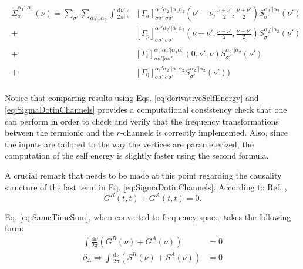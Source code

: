 \documentclass[12pt,a4paper,roman]{article}
\newcommand{\dd}{\mathrm{d}}
\begin{document}
\begin{align}
	\begin{split}
	\dot{\Sigma}^{\alpha_1'|\alpha_1}_\sigma (\nu) = \sum_{\sigma'} \sum_{\alpha_2', \alpha_2} \int \frac{\dd\nu'}{2\pi i} \Bigg( &\left[\Gamma_a\right]^{\alpha_1'\alpha_2'|\alpha_1\alpha_2}_{\sigma\sigma'|\sigma\sigma'}\left(\nu'-\nu, \frac{\nu+\nu'}{2}, \frac{\nu+\nu'}{2}\right) S^{\alpha_2'|\alpha_2}_{\sigma'}(\nu')\\
	+&\left[\Gamma_p\right]^{\alpha_1'\alpha_2'|\alpha_1\alpha_2}_{\sigma\sigma'|\sigma\sigma'}\left(\nu+\nu', \frac{\nu-\nu'}{2}, \frac{\nu-\nu'}{2}\right)
	S^{\alpha_2'|\alpha_2}_{\sigma'}(\nu') \\
	+&\left[\Gamma_t\right]^{\alpha_1'\alpha_2'|\alpha_1\alpha_2}_{\sigma\sigma'|\sigma\sigma'}\left(0, \nu', \nu \right) S^{\alpha_2'|\alpha_2}_{\sigma'}(\nu')\\
	+&\left[\Gamma_0\right]^{\alpha_1'\alpha_2'|\alpha_1\alpha_2}_{\sigma\sigma'|\sigma\sigma'} S^{\alpha_2'|\alpha_2}_{\sigma'}(\nu')\Bigg)\end{split}
	\label{eq:SigmaDotinChannels}
\end{align}

Notice that comparing results using Eqs. \eqref{eq:derivativeSelfEnergy} and \eqref{eq:SigmaDotinChannels} provides a computational consistency check that one can perform in order to check and verify that the frequency transformations between the fermionic and the $r$-channels is correctly implemented. Also, since the inputs are tailored to the way the vertices are parameterized, the computation of the self energy is slightly faster using the second formula.

A crucial remark that needs to be made at this point regarding the causality structure of the last term in Eq. \eqref{eq:SigmaDotinChannels}. According to Ref. \cite{kamenev_2011}, 
\begin{equation}
	G^R(t,t) + G^A(t,t) = 0.
	\label{eq:SameTimeSum}
\end{equation}

Eq. \ref{eq:SameTimeSum}, when converted to frequency space, takes the following form:
\begin{align}
\int \frac{\dd \nu}{2 \pi} \left( G^R(\nu) + G^A(\nu) \right) &= 0\\
\partial_\Lambda\Rightarrow \int \frac{\dd \nu}{2 \pi} \left( S^R(\nu) + S^A(\nu) \right) &= 0
\label{eq:SameTimeConstranit}
\end{align}
\end{document}
